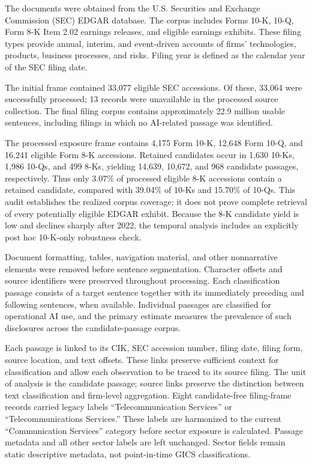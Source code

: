 \documentclass[12pt]{article}
\begin{document}
The documents were obtained from the U.S. Securities and Exchange Commission
(SEC) EDGAR database. The corpus includes Forms 10-K, 10-Q, Form 8-K
Item 2.02 earnings releases, and eligible earnings exhibits. These filing
types provide annual, interim, and event-driven accounts of firms'
technologies, products, business processes, and risks. Filing year is defined
as the calendar year of the SEC filing date.

The initial frame contained 33,077 eligible SEC accessions. Of these, 33,064
were successfully processed; 13 records were unavailable in the processed
source collection. The final filing corpus contains approximately 22.9
million usable sentences, including filings in which no AI-related passage was
identified.

The processed exposure frame contains 4,175 Form 10-K, 12,648 Form 10-Q, and
16,241 eligible Form 8-K accessions. Retained candidates occur in 1,630 10-Ks,
1,986 10-Qs, and 499 8-Ks, yielding 14,639, 10,672, and 968 candidate
passages, respectively. Thus only 3.07\% of processed eligible 8-K accessions
contain a retained candidate, compared with 39.04\% of 10-Ks and 15.70\% of
10-Qs. This audit establishes the realized corpus coverage; it does not prove
complete retrieval of every potentially eligible EDGAR exhibit. Because the
8-K candidate yield is low and declines sharply after 2022, the temporal
analysis includes an explicitly post hoc 10-K-only robustness check.

Document formatting, tables, navigation material, and other nonnarrative
elements were removed before sentence segmentation. Character offsets and
source identifiers were preserved throughout processing. Each classification
passage consists of a target sentence together with its immediately preceding
and following sentences, when available. Individual passages are classified
for operational AI use, and the primary estimate measures the prevalence of
such disclosures across the candidate-passage corpus.

Each passage is linked to its CIK, SEC accession number, filing date, filing
form, source location, and text offsets. These links preserve sufficient
context for classification and allow each observation to be traced to its
source filing. The unit of analysis is the candidate passage; source links preserve the
distinction between text classification and firm-level aggregation.
Eight candidate-free filing-frame records carried legacy labels
``Telecommunication Services'' or ``Telecommunications Services.'' These
labels are harmonized to the current ``Communication Services'' category
before sector exposure is calculated. Passage metadata and all other sector
labels are left unchanged. Sector fields remain static descriptive metadata,
not point-in-time GICS classifications.
\end{document}
